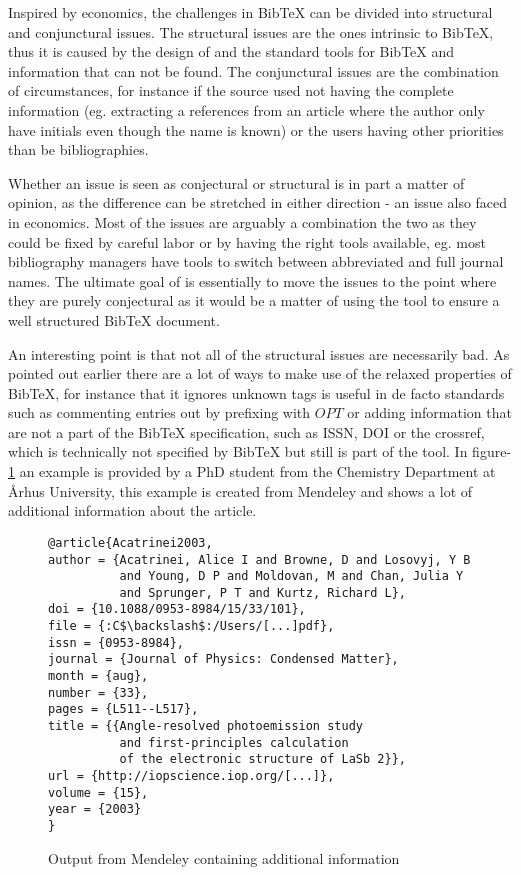 Inspired by economics, the challenges in Bib{\TeX} can be divided into
structural and conjunctural issues.  The structural issues are the
ones intrinsic to Bib{\TeX}, thus it is caused by the design of and
the standard tools for Bib{\TeX} and information that can not be
found.  The conjunctural issues are the combination of circumstances,
for instance if the source used not having the complete information
(eg. extracting a references from an article where the author only
have initials even though the name is known) or the users having other
priorities than be bibliographies.

Whether an issue is seen as conjectural or structural is in part a
matter of opinion, as the difference can be stretched in either
direction - an issue also faced in economics.  Most of the issues are
arguably a combination the two as they could be fixed by careful labor
or by having the right tools available, eg. most bibliography managers
have tools to switch between abbreviated and full journal names.  The
ultimate goal of {\Orangutan} is essentially to move the issues to the
point where they are purely conjectural as it would be a matter of
using the tool to ensure a well structured Bib{\TeX} document.

An interesting point is that not all of the structural issues are
necessarily bad.  As pointed out earlier there are a lot of ways to
make use of the relaxed properties of Bib{\TeX}, for instance that it
ignores unknown tags is useful in de facto standards such as
commenting entries out by prefixing with $OPT$ or adding information
that are not a part of the Bib{\TeX} specification, such as ISSN, DOI
or the crossref, which is technically not specified by Bib{\TeX} but
still is part of the tool.  In figure-\ref{fig:mendeley_output}
an example is provided by a PhD student from the Chemistry Department
at Århus University, this example is created from Mendeley and shows a
lot of additional information about the article.

\begin{figure}[ht]
  \centering
\begin{small}
\begin{verbatim}
@article{Acatrinei2003,
author = {Acatrinei, Alice I and Browne, D and Losovyj, Y B 
          and Young, D P and Moldovan, M and Chan, Julia Y
          and Sprunger, P T and Kurtz, Richard L},
doi = {10.1088/0953-8984/15/33/101},
file = {:C$\backslash$:/Users/[...]pdf},
issn = {0953-8984},
journal = {Journal of Physics: Condensed Matter},
month = {aug},
number = {33},
pages = {L511--L517},
title = {{Angle-resolved photoemission study 
          and first-principles calculation 
          of the electronic structure of LaSb 2}},
url = {http://iopscience.iop.org/[...]},
volume = {15},
year = {2003}
}
\end{verbatim}
\end{small}
  \caption{Output from Mendeley containing additional information}
  \label{fig:mendeley_output}
\end{figure}

